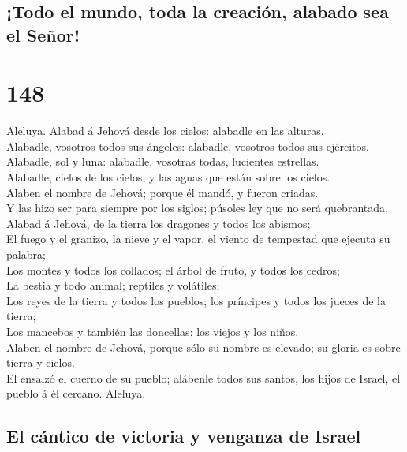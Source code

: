 \hypertarget{todo-el-mundo-toda-la-creaciuxf3n-alabado-sea-el-seuxf1or}{%
\subsection{¡Todo el mundo, toda la creación, alabado sea el
Señor!}\label{todo-el-mundo-toda-la-creaciuxf3n-alabado-sea-el-seuxf1or}}

\hypertarget{section-147}{%
\section{148}\label{section-147}}

 Aleluya. Alabad á Jehová desde los cielos: alabadle en
las alturas.\\
 Alabadle, vosotros todos sus ángeles: alabadle, vosotros
todos sus ejércitos.\\
 Alabadle, sol y luna: alabadle, vosotras todas, lucientes
estrellas.\\
 Alabadle, cielos de los cielos, y las aguas que están
sobre los cielos.\\
 Alaben el nombre de Jehová; porque él mandó, y fueron
criadas.\\
 Y las hizo ser para siempre por los siglos; púsoles ley
que no será quebrantada.\\
 Alabad á Jehová, de la tierra los dragones y todos los
abismos;\\
 El fuego y el granizo, la nieve y el vapor, el viento de
tempestad que ejecuta su palabra;\\
 Los montes y todos los collados; el árbol de fruto, y
todos los cedros;\\
 La bestia y todo animal; reptiles y volátiles;\\
 Los reyes de la tierra y todos los pueblos; los
príncipes y todos los jueces de la tierra;\\
 Los mancebos y también las doncellas; los viejos y los
niños,\\
 Alaben el nombre de Jehová, porque sólo su nombre es
elevado; su gloria es sobre tierra y cielos.\\
 El ensalzó el cuerno de su pueblo; alábenle todos sus
santos, los hijos de Israel, el pueblo á él cercano. Aleluya.

\hypertarget{el-cuxe1ntico-de-victoria-y-venganza-de-israel}{%
\subsection{El cántico de victoria y venganza de
Israel}\label{el-cuxe1ntico-de-victoria-y-venganza-de-israel}}

